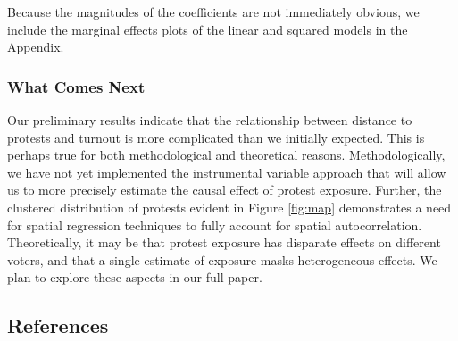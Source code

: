 \documentclass[
  12pt,
]{article}
\begin{document}
Because the magnitudes of the coefficients are not immediately obvious, we include the marginal effects plots of the linear and squared models in the Appendix.

\hypertarget{what-comes-next}{%
\subsubsection*{What Comes Next}\label{what-comes-next}}

Our preliminary results indicate that the relationship between distance to protests and turnout is more complicated than we initially expected. This is perhaps true for both methodological and theoretical reasons. Methodologically, we have not yet implemented the instrumental variable approach that will allow us to more precisely estimate the causal effect of protest exposure. Further, the clustered distribution of protests evident in Figure \ref{fig:map} demonstrates a need for spatial regression techniques to fully account for spatial autocorrelation. Theoretically, it may be that protest exposure has disparate effects on different voters, and that a single estimate of exposure masks heterogeneous effects. We plan to explore these aspects in our full paper.

\newpage

\hypertarget{references}{%
\subsection*{References}\label{references}}
\end{document}
